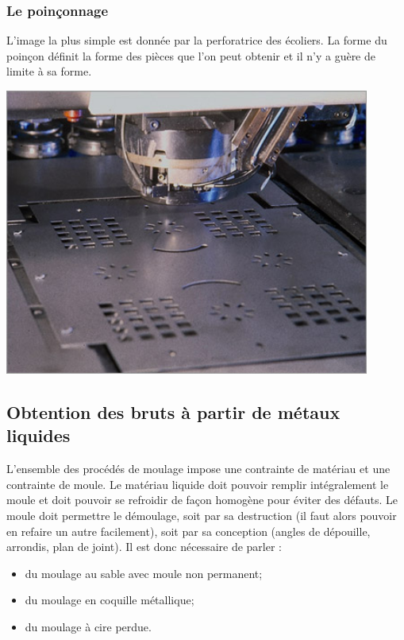\documentclass[11pt,oneside]{article}
\begin{document}
\subsubsection{Le poinçonnage}
\begin{minipage}[c]{.65\linewidth}
L'image la plus simple est donnée par la perforatrice des écoliers. La forme du poinçon définit la forme des pièces que l'on peut obtenir et il n'y a guère de limite à sa forme.

\end{minipage}\hfill
\begin{minipage}[c]{.3\linewidth}
\begin{center}
\includegraphics[width=0.9\textwidth]{png/poinconnage}
\end{center}
\end{minipage}



\subsection{Obtention des bruts à partir de métaux liquides}
L'ensemble des procédés de moulage impose une contrainte de matériau et une contrainte de moule. Le matériau liquide doit pouvoir remplir intégralement le moule et doit pouvoir se refroidir de façon homogène pour éviter des défauts. Le moule doit permettre le démoulage, soit par sa destruction (il faut alors pouvoir en refaire un autre facilement), soit par sa conception (angles de dépouille, arrondis, plan de joint). Il est donc nécessaire de parler :
\begin{itemize}
\item du moulage au sable avec moule non permanent;
\item du moulage en coquille métallique;
\item du moulage à cire perdue.
\end{itemize}
\end{document}
